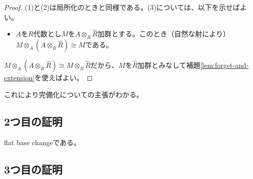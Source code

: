 \documentclass[uplatex, a4paper, dvipdfmx]{jsarticle}
\theoremstyle{definition}
\begin{document}
\begin{proof}
    (1)と(2)は局所化のときと同様である。(3)については、以下を示せばよい。
    \begin{itemize}
        \item $A$を$R$代数とし$M$を$A \otimes_R \widehat{R}$加群とする。このとき（自然な射により）$M \otimes_A (A \otimes_R \widehat{R}) \cong M$である。
    \end{itemize}
    $M \otimes_A (A \otimes_R \widehat{R}) \cong M \otimes_R \widehat{R}$だから、$M$を$\widehat{R}$加群とみなして補題\ref{lem:forget-and-extension}を使えばよい。
\end{proof}
これにより完備化についての主張がわかる。
\subsection{2つ目の証明}
flat base changeである。
\subsection{3つ目の証明}
\printbibliography[title=参考文献]
\end{document}
